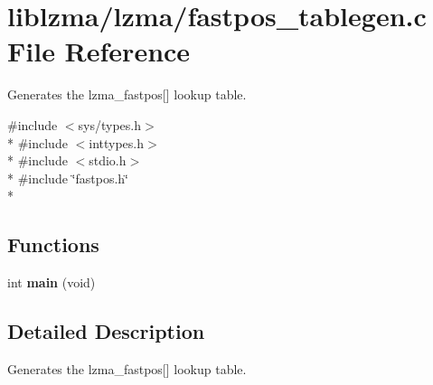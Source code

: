 \section{liblzma/lzma/fastpos\-\_\-tablegen.c File Reference}
\label{fastpos__tablegen_8c}


Generates the lzma\-\_\-fastpos[] lookup table.  


{\ttfamily \#include $<$sys/types.\-h$>$}\\*
{\ttfamily \#include $<$inttypes.\-h$>$}\\*
{\ttfamily \#include $<$stdio.\-h$>$}\\*
{\ttfamily \#include \char`\"{}fastpos.\-h\char`\"{}}\\*
\subsection*{Functions}
\begin{DoxyCompactItemize}
\item 
int {\bfseries main} (void)\label{fastpos__tablegen_8c_a840291bc02cba5474a4cb46a9b9566fe}

\end{DoxyCompactItemize}


\subsection{Detailed Description}
Generates the lzma\-\_\-fastpos[] lookup table. 